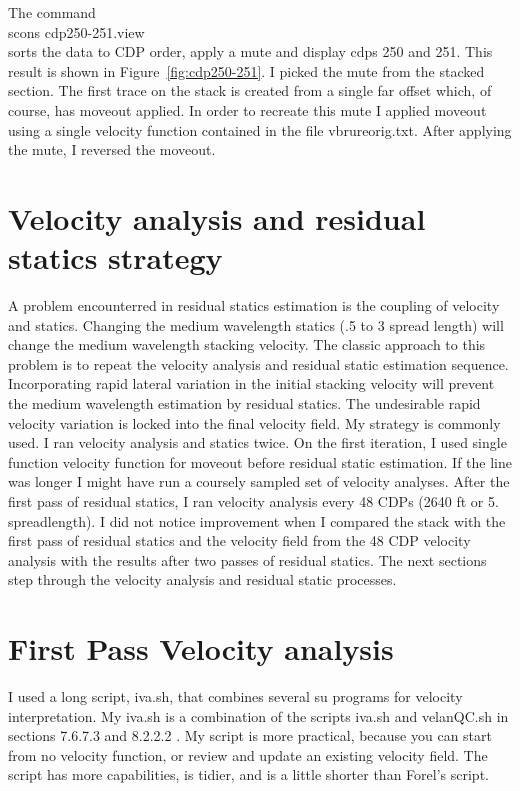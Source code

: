 The command\\
scons cdp250-251.view \\
sorts the data to CDP order, apply a mute and display cdps 250 and 
251.  This result is shown in Figure~\ref{fig:cdp250-251}.  I picked 
the mute from the stacked section.  The first trace on the stack is 
created from a single far offset which, of course, has moveout applied.  
In order to recreate this mute I applied moveout using a single velocity 
function contained in the file vbrureorig.txt. After applying the mute, 
I reversed the moveout.

\section{Velocity analysis and residual statics strategy}
A problem encounterred in residual statics estimation is the coupling of 
velocity and statics.  Changing the medium wavelength statics (.5 to 3 
spread length) will change the medium wavelength stacking velocity.  
The classic approach to this problem is to repeat the velocity analysis 
and residual static estimation sequence.  Incorporating rapid lateral 
variation in the initial stacking velocity will prevent the medium wavelength 
estimation by residual statics.  The undesirable rapid velocity variation 
is locked into the final velocity field.  My strategy is 
commonly used.  I ran velocity analysis and statics twice.  On the first 
iteration, I used single function velocity function for moveout before 
residual static estimation.  If the line was longer I might have run
a coursely sampled set of velocity analyses. After the first 
pass of residual statics,  I ran velocity analysis every 48 CDPs (2640 ft 
or 5. spreadlength).  I did not notice improvement when I compared the 
stack with the first pass of residual statics and the velocity field from 
the 48 CDP velocity analysis with the results after two passes of residual 
statics.  The next sections step through the velocity analysis and residual 
static processes.

\section{First Pass Velocity analysis}
I used a long script, iva.sh, that combines several su programs for velocity 
interpretation.  My iva.sh is a combination of the scripts iva.sh and 
velanQC.sh in sections 7.6.7.3 and 8.2.2.2 \cite[]{forel}.  My script is 
more practical, because you can start from no velocity function, or review 
and update an existing velocity field.  The script has more capabilities, 
is tidier, and is a little shorter than Forel's script.

